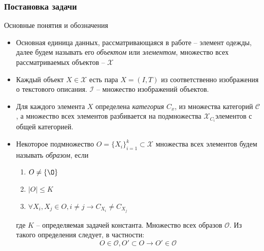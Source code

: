 \documentclass[10pt]{beamer}
\begin{document}
\begin{frame}
	\frametitle{Постановка задачи}
		\begin{block}{Основные понятия и обозначения}
			\begin{itemize}
				\item Основная единица данных, рассматривающаяся в работе -- элемент одежды, далее будем называть его \textit{объектом} или \textit{элементом}, множество всех рассматриваемых объектов -- $\mathcal{X}$
				
				\item Каждый объект $X\in\mathcal{X}$ есть пара $X = (I, T)$ из соответственно изображения о текстового описания.  $\mathcal{I}$ -- множество изображений объектов.
				
				\item Для каждого элемента $X$ определена \textit{категория} $C_x$, из множества категорий $\mathcal{C}$, а множество всех элементов разбивается на подмножества $\mathcal{X}_{C_i}$элементов с общей категорией.
				
				\item 	Некоторое подмножество $O = \{X_i\}_{i=1}^k\subset \mathcal{X}$ множества всех элементов будем называть \textit{образом}, если
				\begin{enumerate}
					\item $O\neq\{\O\}$
					\item $|O| \leqslant K$
					\item $\forall X_i, X_j \in O, i\neq j\longrightarrow C_{X_i} \neq C_{X_j}$
				\end{enumerate}
				где $K$ -- определяемая задачей константа. 
				Множество всех образов $\mathcal{O}$.
				Из такого определения следует, в частности:
				$$O\in\mathcal{O}, O'\subset O \longrightarrow O'\in\mathcal{O}$$
			\end{itemize}
		\end{block}					
\end{frame}
\end{document}
